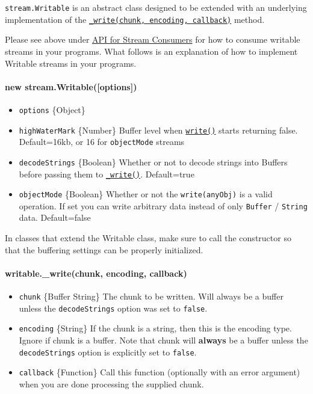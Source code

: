 \texttt{stream.Writable} is an abstract class designed to be extended
with an underlying implementation of the
\hyperref[streamux5fwritableux5fwriteux5fchunkux5fencodingux5fcallbackux5f1]{\texttt{\_write(chunk,\ encoding,\ callback)}}
method.

Please see above under
\hyperref[streamux5fapiux5fforux5fstreamux5fconsumers]{API for Stream
Consumers} for how to consume writable streams in your programs. What
follows is an explanation of how to implement Writable streams in your
programs.

\paragraph{new
stream.Writable({[}options{]})}\label{new-stream.writableoptions}

\begin{itemize}
\itemsep1pt\parskip0pt
\item
  \texttt{options} \{Object\}
\item
  \texttt{highWaterMark} \{Number\} Buffer level when
  \hyperref[streamux5fwritableux5fwriteux5fchunkux5fencodingux5fcallback]{\texttt{write()}}
  starts returning false. Default=16kb, or 16 for \texttt{objectMode}
  streams
\item
  \texttt{decodeStrings} \{Boolean\} Whether or not to decode strings
  into Buffers before passing them to
  \hyperref[streamux5fwritableux5fwriteux5fchunkux5fencodingux5fcallbackux5f1]{\texttt{\_write()}}.
  Default=true
\item
  \texttt{objectMode} \{Boolean\} Whether or not the
  \texttt{write(anyObj)} is a valid operation. If set you can write
  arbitrary data instead of only \texttt{Buffer} / \texttt{String} data.
  Default=false
\end{itemize}

In classes that extend the Writable class, make sure to call the
constructor so that the buffering settings can be properly initialized.

\paragraph{writable.\_write(chunk, encoding,
callback)}\label{writable.ux5fwritechunk-encoding-callback}

\begin{itemize}
\itemsep1pt\parskip0pt
\item
  \texttt{chunk} \{Buffer \textbar{} String\} The chunk to be written.
  Will always be a buffer unless the \texttt{decodeStrings} option was
  set to \texttt{false}.
\item
  \texttt{encoding} \{String\} If the chunk is a string, then this is
  the encoding type. Ignore if chunk is a buffer. Note that chunk will
  \textbf{always} be a buffer unless the \texttt{decodeStrings} option
  is explicitly set to \texttt{false}.
\item
  \texttt{callback} \{Function\} Call this function (optionally with an
  error argument) when you are done processing the supplied chunk.
\end{itemize}

